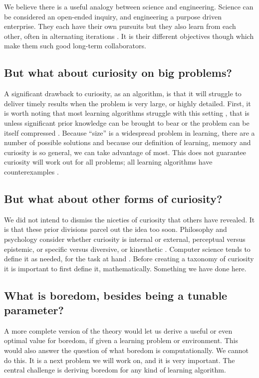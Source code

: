 We believe there is a useful analogy between science and engineering. Science can be considered an open-ended inquiry, and engineering a purpose driven enterprise. They each have their own pursuits but they also learn from each other, often in alternating iterations \citep{Gupta2006}. It is their different objectives though which make them such good long-term collaborators.


\subsection*{But what about curiosity on big problems?}
A significant drawback to curiosity, as an algorithm, is that it will struggle to deliver timely results when the problem is very large, or highly detailed. First, it is worth noting that most learning algorithms struggle with this setting \citep{MacKay2003,Sutton2018}, that is unless significant prior knowledge can be brought to bear \citep{Zhang2020,Sutton2018} or the problem can be itself compressed \citep{Ha2018a,Fister2019}. Because ``size'' is a widespread problem in learning, there are a number of possible solutions and because our definition of learning, memory and curiosity is so general, we can take advantage of most. This does not guarantee curiosity will work out for all problems; all learning algorithms have counterexamples \citep{Wolpert1997}. 


\subsection*{But what about other forms of curiosity?}
We did not intend to dismiss the niceties of curiosity that others have revealed. It is that these prior divisions parcel out the idea too soon. Philosophy and psychology consider whether curiosity is internal or external, perceptual versus epistemic, or specific versus diversive, or kinesthetic \citep{Kidd2015,Berlyne1950,Zhou2020}. Computer science tends to define it as needed, for the task at hand \citep{Stanley2004,Lehman2011a,Lehman2013,Mouret2015,Colas2020}. Before creating a taxonomy of curiosity it is important to first define it, mathematically. Something we have done here.


\subsection*{What is boredom, besides being a tunable parameter?}
A more complete version of the theory would let us derive a useful or even optimal value for boredom, if given a learning problem or environment. This would also answer the question of what boredom is computationally. We cannot do this. It is a next problem we will work on, and it is very important. The central challenge is deriving boredom for any kind of learning algorithm.


